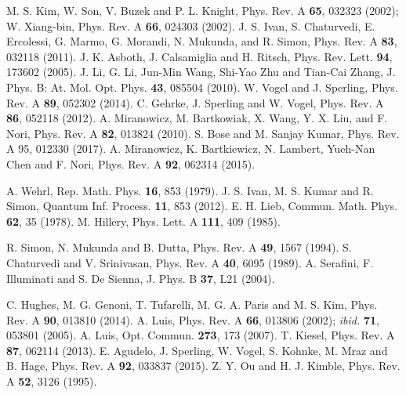 \documentclass[letter,scriptaddress,twocolumn,prl,showkeys]{revtex4}
\begin{document}
\begin{thebibliography}{}
 M. S. Kim, W. Son, V. Buzek and P. L. Knight, Phys. Rev. A {\bf 65}, 032323 (2002); W. Xiang-bin, Phys. Rev. A {\bf 66}, 024303 (2002).
 J. S. Ivan, S. Chaturvedi, E. Ercolessi, G. Marmo, G. Morandi, N. Mukunda, and R. Simon, Phys. Rev. A {\bf 83}, 032118 (2011).
 J. K. Asboth, J. Calsamiglia and H. Ritsch, Phys. Rev. Lett. {\bf 94}, 173602 (2005).
 J. Li, G. Li, Jun-Min Wang, Shi-Yao Zhu and Tian-Cai Zhang, J. Phys. B: At. Mol. Opt. Phys. {\bf 43}, 085504 (2010).
 W. Vogel and J. Sperling, Phys. Rev. A {\bf 89}, 052302 (2014).
 C. Gehrke, J. Sperling and W. Vogel, Phys. Rev. A {\bf 86}, 052118 (2012).
 A. Miranowicz, M. Bartkowiak, X. Wang, Y. X. Liu, and F. Nori, Phys. Rev. A {\bf 82}, 013824 (2010).
 S. Bose and M. Sanjay Kumar, Phys. Rev. A 95, 012330 (2017).
 A. Miranowicz, K. Bartkiewicz, N. Lambert, Yueh-Nan Chen and F. Nori, Phys. Rev. A {\bf 92}, 062314 (2015).

 A. Wehrl, Rep. Math. Phys. {\bf 16}, 853 (1979).
 J. S. Ivan, M. S. Kumar and R. Simon, Quantum Inf. Process. {\bf 11}, 853 (2012).
 E. H. Lieb, Commun. Math. Phys. {\bf 62}, 35 (1978).
 M. Hillery, Phys. Lett. A {\bf 111}, 409 (1985).

 R. Simon, N. Mukunda and B. Dutta, Phys. Rev. A {\bf 49}, 1567 (1994).
 S. Chaturvedi and V. Srinivasan, Phys. Rev. A {\bf 40}, 6095 (1989).
 A. Serafini, F. Illuminati and S. De Sienna, J. Phys. B {\bf 37}, L21 (2004). 

 C. Hughes, M. G. Genoni, T. Tufarelli, M. G. A. Paris and M. S. Kim, Phys. Rev. A {\bf 90}, 013810 (2014).
 A. Luis, Phys. Rev. A {\bf 66}, 013806 (2002); {\em ibid.} {\bf 71}, 053801 (2005).
 A. Luis, Opt. Commun. {\bf 273}, 173 (2007).
 T. Kiesel, Phys. Rev. A {\bf 87}, 062114 (2013).
 E. Agudelo, J. Sperling, W. Vogel, S. Kohnke, M. Mraz and B. Hage, Phys. Rev. A {\bf 92}, 033837 (2015).
 Z. Y. Ou and H. J. Kimble, Phys. Rev. A {\bf 52}, 3126 (1995).

\end{thebibliography}
\end{document}
